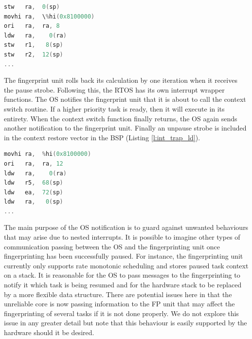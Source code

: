 		\begin{lstlisting}[frame=single,language=C,label=l:int_trap_st,caption=The updated trap at the start of an interrupt.]
stw   ra,  0(sp)
movhi ra,  \%hi(0x8100000)
ori   ra,  ra, 8
ldw   ra,    0(ra)
stw   r1,   8(sp)
stw   r2,  12(sp)
...
\end{lstlisting}

	The fingerprint unit rolls back its calculation by one iteration when it receives the pause strobe. 
	Following this, the RTOS has its own interrupt wrapper functions. The OS notifies the fingerprint unit that it is about to call the context switch routine.
	If a higher priority task is ready, then it will execute in its entirety.
	When the context switch function finally returns, the OS again sends another notification to the fingerprint unit. 
	Finally an unpause strobe is included in the context restore vector in the BSP (Listing \ref{l:int_trap_ld}).
	\begin{lstlisting}[frame=single,language=C,label=l:int_trap_ld,caption=The updated trap at the end of an interrupt.]
movhi ra,  %hi(0x8100000)
ori   ra,  ra, 12
ldw   ra,    0(ra)
ldw   r5,  68(sp)
ldw   ea,  72(sp)  
ldw   ra,   0(sp)
...
\end{lstlisting} 
	The main purpose of the OS notification is to guard against unwanted behaviours that may arise due to nested interrupts. It is possible to imagine other types of communication passing between the OS and the fingerprinting unit once fingerprinting has been successfully paused. 
	For instance, the fingerprinting unit currently only supports rate monotonic scheduling and stores paused task context on a stack. 
	It is reasonable for the OS to pass messages to the fingerprinting to notify it which task is being resumed and for the hardware stack to be replaced by a more flexible data structure. 
	There are potential issues here in that the unreliable core is now passing information to the FP unit that may affect the fingerprinting of several tasks if it is not done properly. 
	We do not explore this issue in any greater detail but note that this behaviour is easily supported by the hardware should it be desired.
%
%
%
%
%

